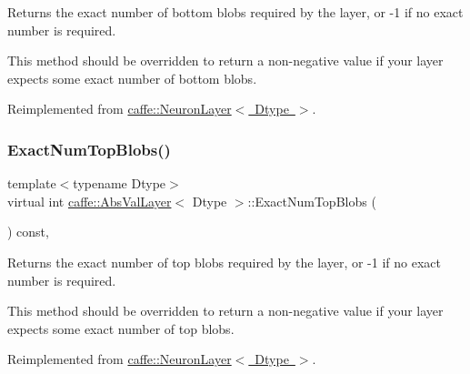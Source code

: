 Returns the exact number of bottom blobs required by the layer, or -\/1 if no exact number is required. 

This method should be overridden to return a non-\/negative value if your layer expects some exact number of bottom blobs. 

Reimplemented from \mbox{\hyperlink{classcaffe_1_1_neuron_layer_abb6c0e6acd2863baf47d6e6acda6f55f}{caffe\+::\+Neuron\+Layer$<$ Dtype $>$}}.

\mbox{\label{classcaffe_1_1_abs_val_layer_aaf18bf4b77994475e8b55e5cefaa654a}} 
\subsubsection{\texorpdfstring{Exact\+Num\+Top\+Blobs()}{ExactNumTopBlobs()}\hspace{0.1cm}{\footnotesize\ttfamily [1/2]}}
{\footnotesize\ttfamily template$<$typename Dtype$>$ \\
virtual int \mbox{\hyperlink{classcaffe_1_1_abs_val_layer}{caffe\+::\+Abs\+Val\+Layer}}$<$ Dtype $>$\+::Exact\+Num\+Top\+Blobs (\begin{DoxyParamCaption}{ }\end{DoxyParamCaption}) const\hspace{0.3cm}{\ttfamily [inline]}, {\ttfamily [virtual]}}



Returns the exact number of top blobs required by the layer, or -\/1 if no exact number is required. 

This method should be overridden to return a non-\/negative value if your layer expects some exact number of top blobs. 

Reimplemented from \mbox{\hyperlink{classcaffe_1_1_neuron_layer_a47ac5e7208e4b14ad1e4040a621dbfbc}{caffe\+::\+Neuron\+Layer$<$ Dtype $>$}}.

\mbox{\label{classcaffe_1_1_abs_val_layer_aaf18bf4b77994475e8b55e5cefaa654a}} 
